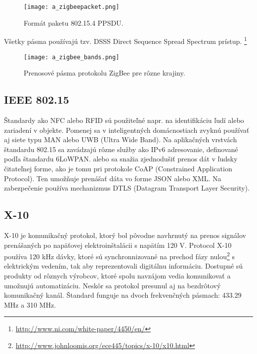 \documentclass[12pt,a4wide,oneside,openright]{report}
\begin{document}
\begin{figure*}[h]
	\centering
	\texttt{[image: a\_zigbeepacket.png]}
	\caption{Formát paketu 802.15.4 PPSDU. \cite{zigbeepacket}}
	\label{f:o_zigbee_packet}
\end{figure*}

Všetky pásma používajú tzv. DSSS Direct Sequence Spread Spectrum prístup. \footnote{\url{http://www.ni.com/white-paper/4450/en/}}
\begin{figure*}[h]
	\centering
	\texttt{[image: a\_zigbee\_bands.png]}
	\caption{Prenosové pásma protokolu ZigBee pre rôzne krajiny. \cite{zigbeebands}}
	\label{f:o_zigbee_bands}
\end{figure*}


\subsection{IEEE 802.15}
Štandardy ako NFC alebo RFID sú použiteľné napr. na identifikáciu ľudí alebo zariadení v objekte. Pomenej sa v inteligentných domácnostiach zvyknú používať aj siete typu MAN alebo UWB (Ultra Wide Band).
Na aplikačných vrstvách štandardu 802.15 sa zavádzajú rôzne služby ako IPv6 adresovanie, definované podľa štandardu 6LoWPAN. alebo sa snažia zjednodušiť prenos dát v ľudsky čitateľnej forme, ako je tomu pri protokole CoAP (Constrained Application Protocol). Ten umožňuje prenášať dáta vo forme JSON alebo XML. Na zabezpečenie používa mechanizmus DTLS (Datagram Transport Layer Security).

\subsection{X-10}
X-10 je komunikačný protokol, ktorý bol pôvodne navhrnutý na prenos signálov prenášaných po napäťovej elektroinštalácii s napätím 120 V. Protocol X-10 používa 120 kHz dávky, ktoré sú synchronnizované na prechod fázy nulou\footnote{\url{http://www.johnloomis.org/ece445/topics/x-10/x10.html}} s elektrickým vedením, tak aby reprezentovali digitálnu informáciu. Dostupné sú produkty od rôznych výrobcov, ktoré spolu navzájom vedia komunikovať a umožnujú automatizáciu.\cite{x10mi}
Neskôr sa protokol presunul aj na bezdrôtový komunikačný kanál. Štandard funguje na dvoch frekvenčných pásmach: 433.29 MHz a 310 MHz. \cite{x10freq}
\end{document}
